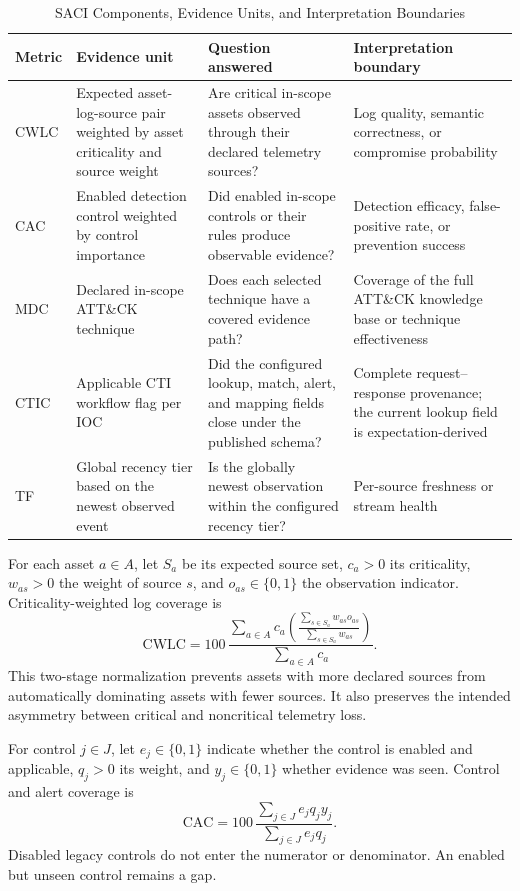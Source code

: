 \documentclass[a4paper,conference]{IEEEtran}
\begin{document}
\begin{table}[!t]
\caption{SACI Components, Evidence Units, and Interpretation Boundaries}
\label{tab:metrics}
\centering
\small
\begin{tabularx}{\textwidth}{p{1.25cm} p{3.15cm} Y Y}
\toprule
\textbf{Metric} & \textbf{Evidence unit} & \textbf{Question answered} & \textbf{Interpretation boundary} \\
\midrule
CWLC & Expected asset-log-source pair weighted by asset criticality and source weight & Are critical in-scope assets observed through their declared telemetry sources? & Log quality, semantic correctness, or compromise probability \\
CAC & Enabled detection control weighted by control importance & Did enabled in-scope controls or their rules produce observable evidence? & Detection efficacy, false-positive rate, or prevention success \\
MDC & Declared in-scope ATT\&CK technique & Does each selected technique have a covered evidence path? & Coverage of the full ATT\&CK knowledge base or technique effectiveness \\
CTIC & Applicable CTI workflow flag per IOC & Did the configured lookup, match, alert, and mapping fields close under the published schema? & Complete request--response provenance; the current lookup field is expectation-derived \\
TF & Global recency tier based on the newest observed event & Is the globally newest observation within the configured recency tier? & Per-source freshness or stream health \\
\bottomrule
\end{tabularx}
\end{table}

For each asset $a\in A$, let $S_a$ be its expected source set, $c_a>0$ its criticality, $w_{as}>0$ the weight of source $s$, and $o_{as}\in\{0,1\}$ the observation indicator. Criticality-weighted log coverage is
\begin{equation}
\mathrm{CWLC}=100\,
\frac{\sum_{a\in A} c_a
\left(\frac{\sum_{s\in S_a}w_{as}o_{as}}{\sum_{s\in S_a}w_{as}}\right)}
{\sum_{a\in A}c_a}.
\label{eq:cwlc}
\end{equation}
This two-stage normalization prevents assets with more declared sources from automatically dominating assets with fewer sources. It also preserves the intended asymmetry between critical and noncritical telemetry loss.

For control $j\in J$, let $e_j\in\{0,1\}$ indicate whether the control is enabled and applicable, $q_j>0$ its weight, and $y_j\in\{0,1\}$ whether evidence was seen. Control and alert coverage is
\begin{equation}
\mathrm{CAC}=100\,
\frac{\sum_{j\in J}e_jq_jy_j}{\sum_{j\in J}e_jq_j}.
\label{eq:cac}
\end{equation}
Disabled legacy controls do not enter the numerator or denominator. An enabled but unseen control remains a gap.
\end{document}
